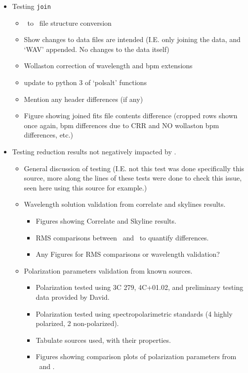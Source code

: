 \begin{itemize}
    \item Testing \texttt{join}
    \begin{itemize}
        \item \iraf\ to \polsalt\ file structure conversion
        \item Show changes to data files are intended (I.E. only joining the data, and `WAV' appended. No changes to the data itself)
        \item Wollaston correction of wavelength and bpm extensions
        \item update to python 3 of `polsalt' functions
        \item Mention any header differences (if any)
        \item Figure showing joined fits file contents difference (cropped rows shown once again, bpm differences due to CRR and NO wollaston bpm differences, etc.)
    \end{itemize}

    \item Testing reduction results not negatively impacted by \stops.
    \begin{itemize}
        \item General discussion of testing (I.E. not this test was done specifically this source, more along the lines of these tests were done to check this issue, seen here using this source for example.)
        \item Wavelength solution validation from correlate and skylines results.
        \begin{itemize}
            \item Figures showing Correlate and Skyline results.
            \item RMS comparisons between \polsalt\ and \iraf\ to quantify differences.
            \item Any Figures for RMS comparisons or wavelength validation?
        \end{itemize}
        \item Polarization parameters validation from known sources.
        \begin{itemize}
            \item Polarization tested using 3C 279, 4C+01.02, and preliminary testing data provided by David.
            \item Polarization tested using spectropolarimetric standards (4 highly polarized, 2 non-polarized).
            \item Tabulate sources used, with their properties.
            \item Figures showing comparison plots of polarization parameters from \polsalt\ and \stops.
        \end{itemize}
    \end{itemize}
\end{itemize}

